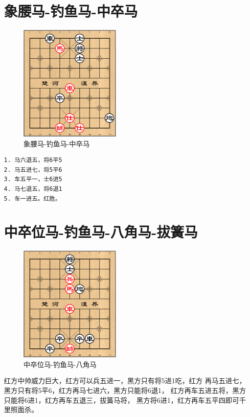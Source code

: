 \documentclass[a5paper,twoside]{book}
\begin{document}
\section{象腰马-钓鱼马-中卒马}
\label{sec-6-8}
\begin{figure}[H]
\centering
\includegraphics[width=5cm]{pic/象腰马-钓鱼马-中卒马.png}
\caption{象腰马-钓鱼马-中卒马}
\end{figure}


\begin{verbatim}
1. 马六退五，将6平5
2. 马五进七，将5平6
3. 车五平一，士6进5
4. 马七退五，将6退1
5. 车一进五。红胜。
\end{verbatim}


\section{中卒位马-钓鱼马-八角马-拔簧马}
\label{sec-6-9}
\begin{figure}[H]
\centering
\includegraphics[width=5cm]{pic/中卒位马-钓鱼马-八角马.png}
\caption{中卒位马-钓鱼马-八角马}
\end{figure}

红方中帅威力巨大，红方可以兵五进一，黑方只有将5进1吃，红方
再马五进七，黑方只有将5平6，红方再马七进六，黑方只能将6退1，
红方再车五进五将，黑方只能将6进1，红方再车五退三，拔簧马将，
黑方将6进1，红方再车五平四即可千里照面杀。
\end{document}

